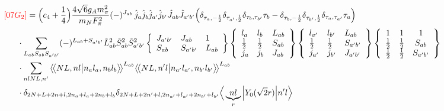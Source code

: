 \documentclass[master]{shnuthesis}
\newcommand{\llangle}{\big\langle\!\big\langle}
\newcommand{\rrangle}{\big\rangle\!\big\rangle}
\newcommand{\ap}{a^\prime}
\newcommand{\bp}{b^\prime}
\newcommand{\il}{\!\!\!\!\!\!\!\!\!\!}
\begin{document}
\begin{align}
    &\il {\color{red} [07G_2]} = \Big(c_4+\frac{1}{4}\Big)\frac{4\sqrt{6}g_A m_\pi^2}{m_N F_\pi^2} (-)^{J_{ab}}\,\hat{j}_a\hat{j}_b\hat{j}_{\ap}\hat{j}_{\bp}\hat{J}_{ab}\hat{J}_{\ap\bp} \Big( \delta_{\tau_a,-\frac{1}{2}}\delta_{\tau_{\ap},\frac{1}{2}}\delta_{\tau_b,\tau_{\bp}}\tau_b - \delta_{\tau_b,-\frac{1}{2}}\delta_{\tau_{\bp},\frac{1}{2}}\delta_{\tau_a,\tau_{\ap}}\tau_a \Big) \notag\\
    & \cdot \sum_{L_{ab}S_{ab}S_{\ap\bp}} (-)^{L_{ab}+S_{\ap\bp}} \hat{L}_{ab}^2\hat{S}_{ab}^2\hat{S}_{\ap\bp}^2  \left\{\begin{array}{lll} J_{\ap\bp} & J_{ab} & 1 \\ S_{ab} & S_{\ap\bp} & L_{ab} \end{array}\right\}  \left\{\begin{array}{lll}l_{a} & l_{b} & L_{ab} \\ \frac{1}{2} & \frac{1}{2} & S_{ab} \\j_{a} & j_{b} & J_{ab} \end{array}\right\} \left\{\begin{array}{lll}l_{\ap} & l_{\bp} & L_{ab} \\ \frac{1}{2} & \frac{1}{2} & S_{\ap\bp} \\j_{\ap} & j_{\bp} & J_{\ap\bp} \end{array}\right\}  \left\{\begin{array}{ccc} 1 & 1 & 1 \\ \frac{1}{2} & \frac{1}{2} & S_{ab} \\ \frac{1}{2} & \frac{1}{2} & S_{\ap\bp} \end{array}\right\}  \notag \\
    & \cdot \sum_{nlNL,n^\prime} \llangle N L, n l \big| n_{a} l_{a}, n_{b} l_{b} \rrangle^{L_{ab}} \llangle N L, n^\prime l \big| n_{a^\prime} l_{a^\prime}, n_{b^\prime} l_{b^\prime} \rrangle^{L_{ab}} \notag\\
    & \cdot \delta_{2N+L+2n+l,2n_a+l_a+2n_b+l_b}\delta_{2N+L+2n^\prime+l,2n_{a^\prime}+l_{a^\prime}+2n_{b^\prime}+l_{b^\prime}}  \Big\langle \underbrace{n l}_{r} \Big| Y_0(\sqrt{2}r) \Big| n^\prime l \Big\rangle
\end{align}
\,\\
\end{document}

